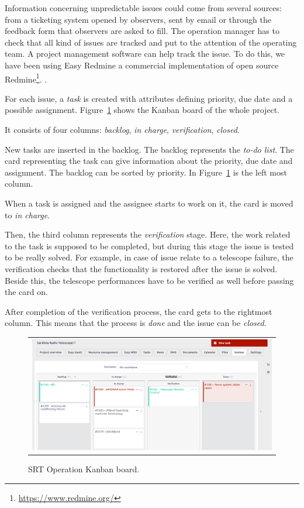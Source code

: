 \documentclass[a4paper]{spie}  %
\begin{document}
Information concerning unpredictable issues could come from several sources: from a ticketing system opened by observers, sent by email or through the feedback form that observers are asked to fill.
The operation manager has to check that all kind of issues are tracked and put to the attention of the operating team. 
A project management software can help track the issue. To do this, we have been using Easy Redmine a commercial implementation of open source Redmine\footnote{\url{https://www.redmine.org/}}.  
. 

For each issue,  a \textit{task} is created with attributes defining  priority, due date and a possible assignment.
Figure~\ref{fig:kanbansrt} shows the Kanban board of the whole project. 

It consists of four columns: \textit{backlog}, \textit{in charge}, \textit{verification}, \textit{closed}.

New tasks are inserted in the backlog. The backlog represents the\textit{ to-do list}. The card representing the task can give information about the priority, due date and assignment.
The backlog can be sorted by priority. In Figure~\ref{fig:kanbansrt} is the left most column.

When a task is assigned and the assignee starts to work on it, the card is moved to {\it in charge}. 

Then, the third column represents the  \textit{verification} stage. Here, the work related to the task is supposed to be completed, but during this stage the issue is tested to be really solved. For example, in case of issue relate to a telescope failure, the verification checks that the functionality is restored after the issue is solved. Beside this, the telescope performances have to be verified as well before passing the card  on.

After completion of the verification process, the card gets to the rightmost column. This means that the process is  \textit{done} and the issue can be \textit{closed}.
\begin{figure} [ht]
   \begin{center}
   \begin{tabular}{c} 
   \includegraphics[width=\textwidth]{kanbanboard.png}
	\end{tabular}
	\end{center}
   \caption[example] 
   { \label{fig:kanbansrt} SRT Operation Kanban  board.}

   \end{figure} 
\end{document}
